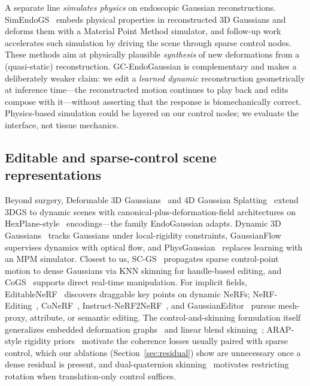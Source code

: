 \documentclass[AMA,Times1COL]{WileyNJDv5} %
\begin{document}
A separate line \emph{simulates physics} on endoscopic Gaussian reconstructions. SimEndoGS~\cite{yang2024simendogs} embeds physical properties in reconstructed 3D Gaussians and deforms them with a Material Point Method simulator, and follow-up work~\cite{yang2025sparsesim} accelerates such simulation by driving the scene through sparse control nodes. These methods aim at physically plausible \emph{synthesis} of new deformations from a (quasi-static) reconstruction. GC-EndoGaussian is complementary and makes a deliberately weaker claim: we edit a \emph{learned dynamic} reconstruction geometrically at inference time---the reconstructed motion continues to play back and edits compose with it---without asserting that the response is biomechanically correct. Physics-based simulation could be layered on our control nodes; we evaluate the interface, not tissue mechanics.

\subsection{Editable and sparse-control scene representations}

Beyond surgery, Deformable 3D Gaussians~\cite{yang2024deformable3dgaussians} and 4D Gaussian Splatting~\cite{wu2024fourdgs} extend 3DGS to dynamic scenes with canonical-plus-deformation-field architectures on HexPlane-style~\cite{cao2023hexplane} encodings---the family EndoGaussian adapts. Dynamic 3D Gaussians~\cite{luiten2024dynamic3dgaussians} tracks Gaussians under local-rigidity constraints, GaussianFlow~\cite{gao2024gaussianflow} supervises dynamics with optical flow, and PhysGaussian~\cite{xie2024physgaussian} replaces learning with an MPM simulator. Closest to us, SC-GS~\cite{huang2024scgs} propagates sparse control-point motion to dense Gaussians via KNN skinning for handle-based editing, and CoGS~\cite{yu2024cogs} supports direct real-time manipulation. For implicit fields, EditableNeRF~\cite{zheng2023editablenerf} discovers draggable key points on dynamic NeRFs; NeRF-Editing~\cite{yuan2022nerfediting}, CoNeRF~\cite{kania2022conerf}, Instruct-NeRF2NeRF~\cite{haque2023instructnerf2nerf}, and GaussianEditor~\cite{chen2024gaussianeditor} pursue mesh-proxy, attribute, or semantic editing. The control-and-skinning formulation itself generalizes embedded deformation graphs~\cite{sumner2007embedded} and linear blend skinning~\cite{magnenatthalmann1988jld,lewis2000posespace,sumner2004deformationtransfer}; ARAP-style rigidity priors~\cite{sorkine2007arap} motivate the coherence losses usually paired with sparse control, which our ablations (Section~\ref{sec:residual}) show are unnecessary once a dense residual is present, and dual-quaternion skinning~\cite{kavan2007dualquaternion,kavan2008geometricskinning} motivates restricting rotation when translation-only control suffices.
\end{document}
